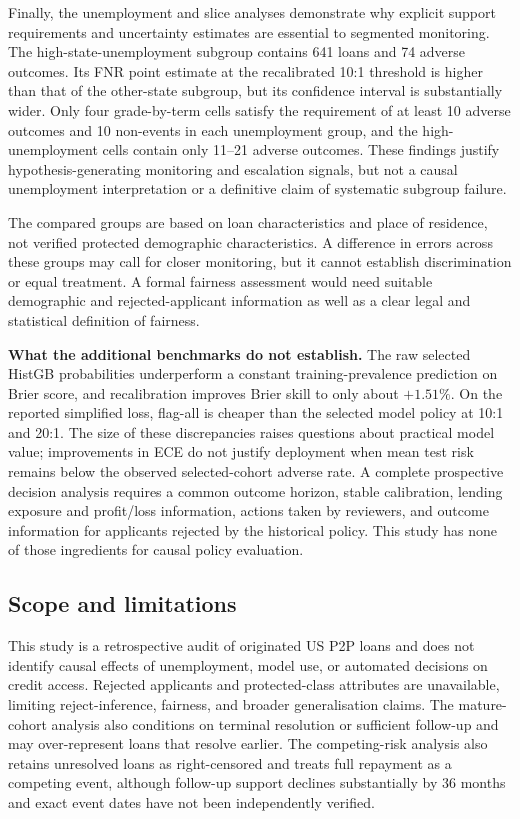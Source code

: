 \documentclass[10pt]{article}
\begin{document}
Finally, the unemployment and slice analyses demonstrate why explicit support requirements and uncertainty estimates are essential to segmented monitoring. The high-state-unemployment subgroup contains 641 loans and 74 adverse outcomes. Its FNR point estimate at the recalibrated 10:1 threshold is higher than that of the other-state subgroup, but its confidence interval is substantially wider. Only four grade-by-term cells satisfy the requirement of at least 10 adverse outcomes and 10 non-events in each unemployment group, and the high-unemployment cells contain only 11--21 adverse outcomes. These findings justify hypothesis-generating monitoring and escalation signals, but not a causal unemployment interpretation or a definitive claim of systematic subgroup failure.

The compared groups are based on loan characteristics and place of residence, not verified protected demographic characteristics. A difference in errors across these groups may call for closer monitoring, but it cannot establish discrimination or equal treatment. A formal fairness assessment would need suitable demographic and rejected-applicant information as well as a clear legal and statistical definition of fairness.

\noindent\textbf{What the additional benchmarks do not establish.} The raw selected HistGB probabilities underperform a constant training-prevalence prediction on Brier score, and recalibration improves Brier skill to only about $+1.51\%$. On the reported simplified loss, flag-all is cheaper than the selected model policy at 10:1 and 20:1. The size of these discrepancies raises questions about practical model value; improvements in ECE do not justify deployment when mean test risk remains below the observed selected-cohort adverse rate. A complete prospective decision analysis requires a common outcome horizon, stable calibration, lending exposure and profit/loss information, actions taken by reviewers, and outcome information for applicants rejected by the historical policy. This study has none of those ingredients for causal policy evaluation.

\subsection{Scope and limitations}
\label{sec:limitations}

This study is a retrospective audit of originated US P2P loans and does not identify causal effects of unemployment, model use, or automated decisions on credit access. Rejected applicants and protected-class attributes are unavailable, limiting reject-inference, fairness, and broader generalisation claims. The mature-cohort analysis also conditions on terminal resolution or sufficient follow-up and may over-represent loans that resolve earlier. The competing-risk analysis also retains unresolved loans as right-censored and treats full repayment as a competing event, although follow-up support declines substantially by 36 months and exact event dates have not been independently verified.
\end{document}
